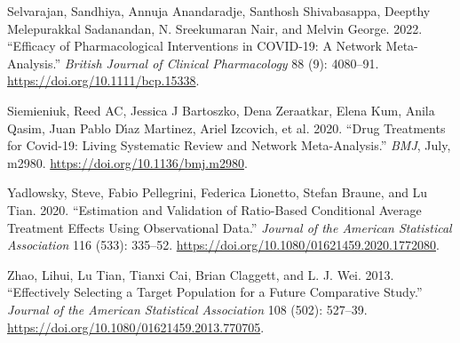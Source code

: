 \documentclass[
  letterpaper,
  DIV=11,
  numbers=noendperiod]{scrreprt}
\newlength{\cslhangindent}
\newlength{\cslentryspacingunit} %
\newenvironment{CSLReferences}[2] %
 {%
  \setlength{\parindent}{0pt}
  \ifodd #1
  \let\oldpar\par
  \def\par{\hangindent=\cslhangindent\oldpar}
  \fi
  \setlength{\parskip}{#2\cslentryspacingunit}
 }%
 {}
\begin{document}
\begin{CSLReferences}{1}{0}
\leavevmode{}%
Selvarajan, Sandhiya, Annuja Anandaradje, Santhosh Shivabasappa, Deepthy
Melepurakkal Sadanandan, N. Sreekumaran Nair, and Melvin George. 2022.
{``Efficacy of Pharmacological Interventions in {COVID}-19: A Network
Meta-Analysis.''} \emph{British Journal of Clinical Pharmacology} 88
(9): 4080--91. \url{https://doi.org/10.1111/bcp.15338}.

\leavevmode{}%
Siemieniuk, Reed AC, Jessica J Bartoszko, Dena Zeraatkar, Elena Kum,
Anila Qasim, Juan Pablo Dı́az Martinez, Ariel Izcovich, et al. 2020.
{``Drug Treatments for Covid-19: Living Systematic Review and Network
Meta-Analysis.''} \emph{{BMJ}}, July, m2980.
\url{https://doi.org/10.1136/bmj.m2980}.

\leavevmode{}%
Yadlowsky, Steve, Fabio Pellegrini, Federica Lionetto, Stefan Braune,
and Lu Tian. 2020. {``Estimation and Validation of Ratio-Based
Conditional Average Treatment Effects Using Observational Data.''}
\emph{Journal of the American Statistical Association} 116 (533):
335--52. \url{https://doi.org/10.1080/01621459.2020.1772080}.

\leavevmode{}%
Zhao, Lihui, Lu Tian, Tianxi Cai, Brian Claggett, and L. J. Wei. 2013.
{``Effectively {Selecting} a {Target Population} for a {Future
Comparative Study}.''} \emph{Journal of the American Statistical
Association} 108 (502): 527--39.
\url{https://doi.org/10.1080/01621459.2013.770705}.

\end{CSLReferences}
\end{document}
